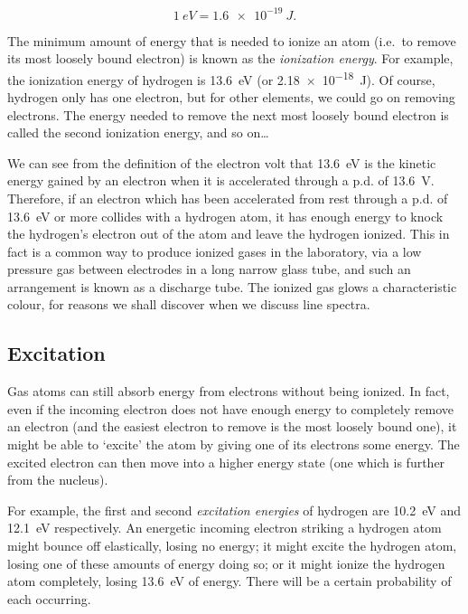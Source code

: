 \[\SI{1}{eV}=\SI{1.6e-19}{J}.\]

The minimum amount of energy that is needed to ionize an atom (i.e.\ to remove its most loosely bound electron) is known as the \emph{ionization energy}.  For example, the ionization energy of hydrogen is \SI{13.6}{eV} (or \SI{2.18e-18}{J}).  Of course, hydrogen only has one electron, but for other elements, we could go on removing electrons.  The energy needed to remove the next most loosely bound electron is called the second ionization energy, and so on\ldots

We can see from the definition of the electron volt that \SI{13.6}{eV} is the kinetic energy gained by an electron when it is accelerated through a p.d. of \SI{13.6}{V}.  Therefore, if an electron which has been accelerated from rest through a p.d. of \SI{13.6}{eV} or more collides with a hydrogen atom, it has enough energy to knock the hydrogen's electron out of the atom and leave the hydrogen ionized.  This in fact is a common way to produce ionized gases in the laboratory, via a low pressure gas between electrodes in a long narrow glass tube, and such an arrangement is known as a discharge tube.  The ionized gas glows a characteristic colour, for reasons we shall discover when we discuss line spectra. %

\subsection{Excitation}

Gas atoms can still absorb energy from electrons without being ionized.  In fact, even if the incoming electron does not have enough energy to completely remove an electron (and the easiest electron to remove is the most loosely bound one), it might be able to `excite' the atom by giving one of its electrons some energy.  The excited electron can then move into a higher energy state (one which is further from the nucleus).

For example, the first and second \emph{excitation energies} of hydrogen are \SI{10.2}{eV} and \SI{12.1}{eV} respectively.  An energetic incoming electron striking a hydrogen atom might bounce off elastically, losing no energy; it might excite the hydrogen atom, losing one of these amounts of energy doing so; or it might ionize the hydrogen atom completely, losing \SI{13.6}{eV} of energy.  There will be a certain probability of each occurring.
